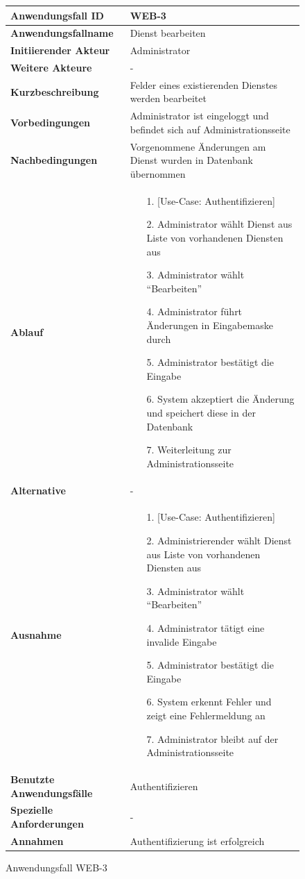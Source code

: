 \begin{figure}[h]
	\centering
	\begin{tabularx}{\textwidth}{ X | X }
		\textbf{Anwendungsfall ID} & WEB-3 \\ \hline
		\textbf{Anwendungsfallname} & Dienst bearbeiten \\ \hline
		\textbf{Initiierender Akteur} & Administrator \\ \hline
		\textbf{Weitere Akteure} & - \\ \hline
		\textbf{Kurzbeschreibung} & Felder eines existierenden Dienstes werden bearbeitet \\ \hline
		\textbf{Vorbedingungen} & Administrator ist eingeloggt und befindet sich auf Administrationsseite \\ \hline
		\textbf{Nachbedingungen} & Vorgenommene Änderungen am Dienst wurden in Datenbank übernommen \\ \hline
		\textbf{Ablauf} &
		\begin{enumerate}
			\item [1.] [Use-Case: Authentifizieren]
			\item [2.] Administrator wählt Dienst aus Liste von vorhandenen Diensten aus
			\item [3.] Administrator wählt ``Bearbeiten''
			\item [4.] Administrator führt Änderungen in Eingabemaske durch
			\item [5.] Administrator bestätigt die Eingabe
			\item [6.] System akzeptiert die Änderung und speichert diese in der Datenbank
			\item [7.] Weiterleitung zur Administrationsseite
		\end{enumerate} \\ \hline
		\textbf{Alternative} & - \\ \hline
		\textbf{Ausnahme} &
		\begin{enumerate}
			\item [1.] [Use-Case: Authentifizieren]
			\item [2.] Administrierender wählt Dienst aus Liste von vorhandenen Diensten aus
			\item [3.] Administrator wählt ``Bearbeiten''
			\item [4.] Administrator tätigt eine invalide Eingabe
			\item [5.] Administrator bestätigt die Eingabe
			\item [6.] System erkennt Fehler und zeigt eine Fehlermeldung an
			\item [7.] Administrator bleibt auf der Administrationsseite
		\end{enumerate}  \\ \hline
		\textbf{Benutzte Anwendungsfälle} & Authentifizieren \\ \hline
		\textbf{Spezielle Anforderungen} & - \\ \hline
		\textbf{Annahmen} & Authentifizierung ist erfolgreich
	\end{tabularx}
	\caption{Anwendungsfall WEB-3}
	\label{fig:anwendungsfall-server-tabelle-web-3}
\end{figure}

